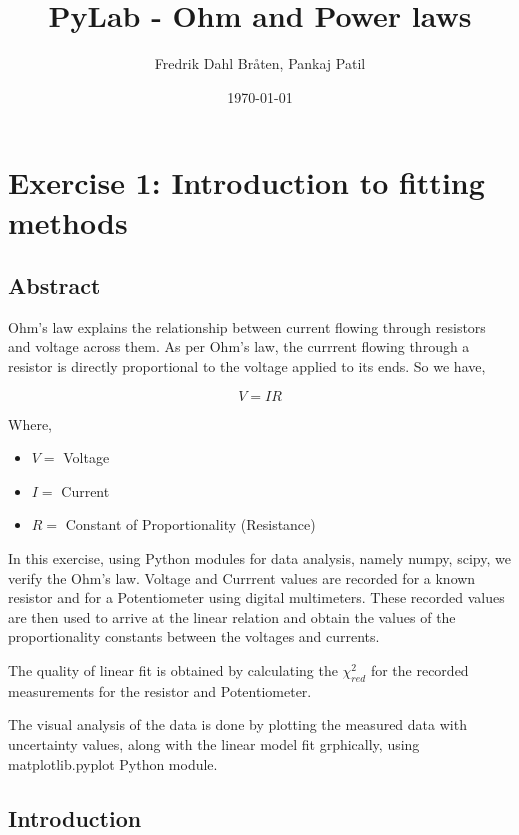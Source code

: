 \documentclass[letterpaper,12pt]{article}
\begin{document}
\title{PyLab - Ohm and Power laws}
\author{Fredrik Dahl Bråten, Pankaj Patil}
\date{\today}
\maketitle
\tableofcontents
\listoffigures
\listoftables

\pagebreak

\section{Exercise 1:  Introduction to fitting methods}

\subsection{Abstract}

Ohm's law explains the relationship between current flowing through resistors and voltage across them.
As per Ohm's law, the currrent flowing through a resistor is directly proportional to the
voltage applied to its ends. So we have,

$$V = IR$$

Where,
\begin{itemize}
  \item[] $V=$ Voltage
  \item[] $I=$ Current
  \item[] $R=$ Constant of Proportionality (Resistance)
\end{itemize}

In this exercise, using Python modules for data analysis, namely numpy, scipy, we 
verify the Ohm's law. Voltage and Currrent values are recorded for a known resistor 
and for a Potentiometer using digital multimeters. These recorded values are then
used to arrive at the linear relation and obtain the values of the proportionality constants  between
the voltages and currents. 

The quality of linear fit is obtained by calculating the $\chi^2_{red}$ for the recorded measurements 
for the resistor and Potentiometer. 

The visual analysis of the data is done by plotting the measured data with uncertainty values, along with the linear model
fit grphically, using matplotlib.pyplot Python module.

\subsection{Introduction}
\end{document}
